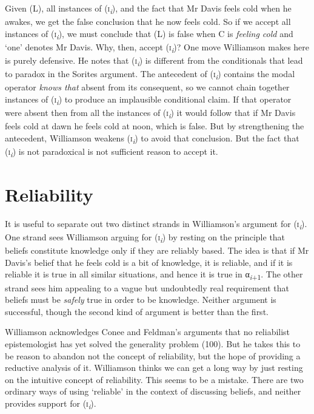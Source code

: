 \documentclass[
  11pt,
  letterpaper,
  DIV=11,
  numbers=noendperiod,
  twoside]{scrartcl}
\begin{document}
Given (L), all instances of (\textsc{i}\textsubscript{\emph{i}}), and
the fact that Mr Davis feels cold when he awakes, we get the false
conclusion that he now feels cold. So if we accept all instances of
(\textsc{i}\textsubscript{\emph{i}}), we must conclude that (L) is false
when C is \emph{feeling cold} and `one' denotes Mr Davis. Why, then,
accept (\textsc{i}\textsubscript{\emph{i}})? One move Williamson makes
here is purely defensive. He notes that
(\textsc{i}\textsubscript{\emph{i}}) is different from the conditionals
that lead to paradox in the Sorites argument. The antecedent of
(\textsc{i}\textsubscript{\emph{i}}) contains the modal operator
\emph{knows that} absent from its consequent, so we cannot chain
together instances of (\textsc{i}\textsubscript{\emph{i}}) to produce an
implausible conditional claim. If that operator were absent then from
all the instances of (\textsc{i}\textsubscript{\emph{i}}) it would
follow that if Mr Davis feels cold at dawn he feels cold at noon, which
is false. But by strengthening the antecedent, Williamson weakens
(\textsc{i}\textsubscript{\emph{i}}) to avoid that conclusion. But the
fact that (\textsc{i}\textsubscript{\emph{i}}) is not paradoxical is not
sufficient reason to accept it.

\section{Reliability}\label{reliability}

It is useful to separate out two distinct strands in Williamson's
argument for (\textsc{i}\textsubscript{\emph{i}}). One strand sees
Williamson arguing for (\textsc{i}\textsubscript{\emph{i}}) by resting
on the principle that beliefs constitute knowledge only if they are
reliably based. The idea is that if Mr Davis's belief that he feels cold
is a bit of knowledge, it is reliable, and if it is reliable it is true
in all similar situations, and hence it is true in
α\textsubscript{\emph{i}+1}. The other strand sees him appealing to a
vague but undoubtedly real requirement that beliefs must be
\emph{safely} true in order to be knowledge. Neither argument is
successful, though the second kind of argument is better than the first.

Williamson acknowledges Conee and Feldman's arguments that no
reliabilist epistemologist has yet solved the generality problem (100).
But he takes this to be reason to abandon not the concept of
reliability, but the hope of providing a reductive analysis of it.
Williamson thinks we can get a long way by just resting on the intuitive
concept of reliability. This seems to be a mistake. There are two
ordinary ways of using `reliable' in the context of discussing beliefs,
and neither provides support for (\textsc{i}\textsubscript{\emph{i}}).
\end{document}

